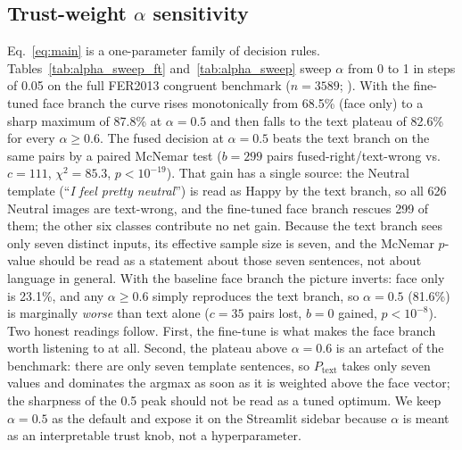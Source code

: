 \documentclass[sigconf,nonacm]{acmart}
\begin{document}
  \subsection{Trust-weight $\alpha$ sensitivity}
  Eq.~\ref{eq:main} is a one-parameter family of decision rules. Tables~\ref{tab:alpha_sweep_ft} and~\ref{tab:alpha_sweep} sweep $\alpha$ from 0 to 1 in steps of 0.05 on the full FER2013 congruent benchmark ($n\!=\!3589$; ). With the fine-tuned face branch the curve rises monotonically from 68.5\% (face only) to a sharp maximum of 87.8\% at $\alpha\!=\!0.5$ and then falls to the text plateau of 82.6\% for every $\alpha\!\geq\!0.6$. The fused decision at $\alpha\!=\!0.5$ beats the text branch on the same pairs by a paired McNemar test ($b\!=\!299$ pairs fused-right/text-wrong vs.\ $c\!=\!111$, $\chi^2\!=\!85.3$, $p\!<\!10^{-19}$). That gain has a single source: the Neutral template (``\emph{I feel pretty neutral}'') is read as Happy by the text branch, so all 626 Neutral images are text-wrong, and the fine-tuned face branch rescues 299 of them; the other six classes contribute no net gain. Because the text branch sees only seven distinct inputs, its effective sample size is seven, and the McNemar $p$-value should be read as a statement about those seven sentences, not about language in general. With the baseline face branch the picture inverts: face only is 23.1\%, and any $\alpha\!\geq\!0.6$ simply reproduces the text branch, so $\alpha\!=\!0.5$ (81.6\%) is marginally \emph{worse} than text alone ($c\!=\!35$ pairs lost, $b\!=\!0$ gained, $p\!<\!10^{-8}$). Two honest readings follow. First, the fine-tune is what makes the face branch worth listening to at all. Second, the plateau above $\alpha\!=\!0.6$ is an artefact of the benchmark: there are only seven template sentences, so $P_\text{text}$ takes only seven values and dominates the argmax as soon as it is weighted above the face vector; the sharpness of the 0.5 peak should not be read as a tuned optimum. We keep $\alpha\!=\!0.5$ as the default and expose it on the Streamlit sidebar because $\alpha$ is meant as an interpretable trust knob, not a hyperparameter.
\end{document}
